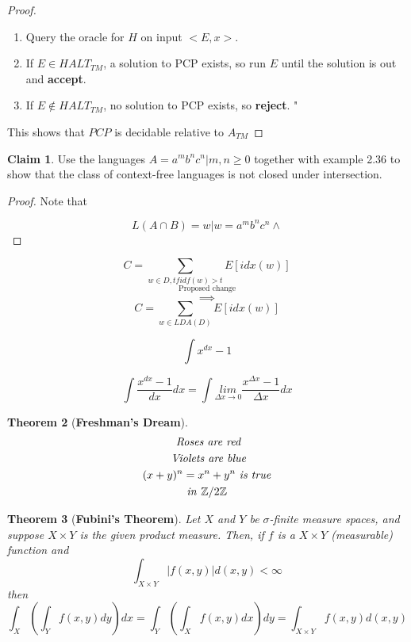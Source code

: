 \documentclass[12pt a]{article}
\newtheorem{theorem}{Theorem}
\theoremstyle{definition}
\theoremstyle{definition}
\newtheorem{claim}[theorem]{Claim}
\theoremstyle{definition}
\begin{document}
{\begin{proof}
\begin{enumerate}
	\item Query the oracle for $H$ on input $<E,x>$. 
	\item If $E \in HALT_{TM}$, a solution to PCP exists, so run $E$ until the solution is out and \textbf{accept}. 
	\item If $E \notin HALT_{TM}$, no solution to PCP exists, so \textbf{reject}. "
\end{enumerate}

This shows that $PCP$ is decidable relative to $A_{TM}$

\end{proof}

\newpage 


\begin{claim}
Use the languages $A={a^{m}b^{n}c^{n}|m,n \geq 0}$ together with example 2.36 to show that the class of context-free languages is not closed under intersection. 
\end{claim} 

\begin{proof}
Note that  

$$L(A\cap B) = {w|w = a^{m}b^{n}c^{n} \wedge
}$$
\end{proof}


$$
C = \sum_{w \in D, tfidf(w)>t} E[idx(w)] $$
$$\overset{\text{Proposed change}}{\implies}$$
$$ C = \sum_{w \in LDA(D)} E[idx(w)]
$$

$$
\int x^{dx} - 1
$$

$$
\int \frac{x^{dx} - 1}{dx} dx 
=
\int \underset{\Delta x \rightarrow 0}{lim} \frac{x^{\Delta x} - 1}{\Delta x} dx
$$


\begin{theorem}[\textbf{Freshman's Dream}]
\begin{multline} 
\phantom{}  
\text{ \textit{Roses are red}} \\ 
\text{ \textit{Violets are blue}} \\ 
(x+y)^{n} = x^n + y^n \text{ \textit{is true}} \\  
\text{\textit{in }} \mathbb{Z}/2\mathbb{Z}  
\end{multline}
\end{theorem}


\begin{theorem}[\textbf{Fubini's Theorem}]
Let $X$ and $Y$ be $\sigma$-finite measure spaces, and suppose $X \times Y$ is the given product measure. Then, if $f$ is a $X \times Y$ (measurable) function and 
$$
\int_{X \times Y} |f(x,y)| d(x,y) < \infty
$$ 
then 
$$
\int_{X} \left( \int_{Y} f(x,y) dy \right) dx = 
\int_{Y} \left( \int_{X} f(x,y) dx \right) dy
=
\int_{X \times Y} f(x,y) d(x,y)
$$ 
\end{theorem}

}
\end{document}
